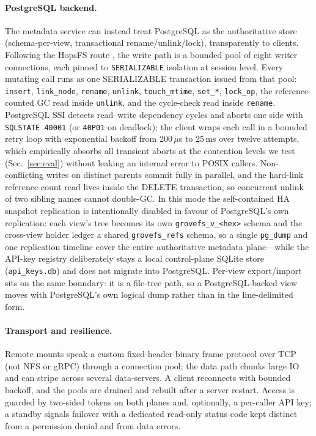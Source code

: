 \documentclass[numberedsection,acmtos]{acmart}
\begin{document}
\paragraph{PostgreSQL backend.} The metadata service can instead treat
PostgreSQL as the authoritative store (schema-per-view, transactional
rename/unlink/lock), transparently to clients. Following the HopsFS route
\citep{hopsfs}, the write path is a bounded pool of eight writer connections,
each pinned to \texttt{SERIALIZABLE} isolation at session level. Every mutating
call runs as one SERIALIZABLE transaction issued from that pool: \texttt{insert},
\texttt{link\_node}, \texttt{rename}, \texttt{unlink}, \texttt{touch\_mtime},
\texttt{set\_*}, \texttt{lock\_op}, the reference-counted GC read inside
\texttt{unlink}, and the cycle-check read inside \texttt{rename}. PostgreSQL SSI
\citep{ports2012} detects read--write dependency cycles and aborts one side with
\texttt{SQLSTATE\,40001} (or \texttt{40P01} on deadlock); the client wraps each
call in a bounded retry loop with exponential backoff from 200\,$\mu$s to
25\,ms over twelve attempts, which empirically absorbs all transient aborts at
the contention levels we test (Sec.~\ref{sec:eval}) without leaking an internal
error to POSIX callers. Non-conflicting writes on distinct parents commit fully
in parallel, and the hard-link reference-count read lives inside the DELETE
transaction, so concurrent unlink of two sibling names cannot double-GC. In this mode the
self-contained HA snapshot replication is intentionally disabled in favour of
PostgreSQL's own replication: each view's tree becomes its own
\texttt{grovefs\_v\_\textless hex\textgreater} schema and the cross-view holder
ledger a shared \texttt{grovefs\_refs} schema, so a single \texttt{pg\_dump} and
one replication timeline cover the entire authoritative metadata plane---while
the API-key registry deliberately stays a local control-plane SQLite store
(\texttt{api\_keys.db}) and does not migrate into PostgreSQL. Per-view
export/import sits on the same boundary: it is a file-tree path, so a
PostgreSQL-backed view moves with PostgreSQL's own logical dump rather than in
the line-delimited form.

\paragraph{Transport and resilience.} Remote mounts speak a custom fixed-header
binary frame protocol over TCP (not NFS or gRPC) through a connection pool; the
data path chunks large IO and can stripe across several data-servers. A client
reconnects with bounded backoff, and the pools are drained and rebuilt after a
server restart. Access is guarded by two-sided tokens on both planes and,
optionally, a per-caller API key; a standby signals
failover with a dedicated read-only status code kept distinct from a permission
denial and from data errors.
\end{document}
